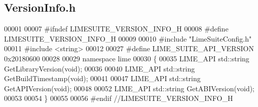 \subsection{Version\+Info.\+h}
\label{VersionInfo_8h_source}

\begin{DoxyCode}
00001 
00007 \textcolor{preprocessor}{#ifndef LIMESUITE\_VERSION\_INFO\_H}
00008 \textcolor{preprocessor}{#define LIMESUITE\_VERSION\_INFO\_H}
00009 
00010 \textcolor{preprocessor}{#include "LimeSuiteConfig.h"}
00011 \textcolor{preprocessor}{#include <string>}
00012 
00027 \textcolor{preprocessor}{#define LIME\_SUITE\_API\_VERSION 0x20180600}
00028 
00029 \textcolor{keyword}{namespace }lime
00030 \{
00035     LIME_API std::string GetLibraryVersion(\textcolor{keywordtype}{void});
00036 
00040     LIME_API std::string GetBuildTimestamp(\textcolor{keywordtype}{void});
00041 
00047     LIME_API std::string GetAPIVersion(\textcolor{keywordtype}{void});
00048 
00052     LIME_API std::string GetABIVersion(\textcolor{keywordtype}{void});
00053 
00054 \}
00055 
00056 \textcolor{preprocessor}{#endif //LIMESUITE\_VERSION\_INFO\_H}
\end{DoxyCode}
